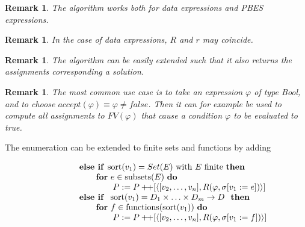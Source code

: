 \documentclass{article}
\newtheorem{remark}[theorem]{Remark}
\newcommand{\concat}{\ensuremath{+\!\!+}}
\begin{document}
\begin{remark}
The algorithm works both for data expressions and PBES expressions.
\end{remark}

\begin{remark}
In the case of data expressions, $R$ and $r$ may coincide.%
\end{remark}

\begin{remark}
The algorithm can be easily extended such that it also returns the assignments
corresponding a solution.
\end{remark}

\begin{remark}
The most common use case is to take an expression $\varphi $ of
type Bool, and to choose $accept(\varphi )\equiv \varphi \neq false$.
Then it can for example be used to compute all assignments to $FV(\varphi)$
that cause a condition $\varphi$ to be evaluated to true.
\end{remark}

The enumeration can be extended to finite sets and functions by adding

\[
\begin{tabular}{l}
\qquad \qquad \textbf{else if }$\mathrm{sort}(v_{1})=Set(E)$
with $E$ finite \textbf{then} \\
\qquad \qquad \qquad \textbf{for} $e\in \mathrm{subsets}(E)$ \textbf{do} \\
\qquad \qquad \qquad \qquad $P:=P\concat\lbrack \left\langle [v_{2},\ldots ,v_{n}],R(\varphi ,\sigma \lbrack v_{1}:=e])\right\rangle ]$ \\
\qquad \qquad \textbf{else if } $\mathrm{sort}%
(v_{1})=D_{1}\times \ldots \times D_{m}\rightarrow D$ \textbf{ then}
\\
\qquad \qquad \qquad \textbf{for} $f\in \mathrm{functions}(\mathrm{%
sort}(v_{1}))$ \textbf{do} \\
\qquad \qquad \qquad \qquad $P:=P\concat\lbrack \left\langle [v_{2},\ldots ,v_{n}],R(\varphi ,\sigma \lbrack v_{1}:=f])\right\rangle ]$%
\end{tabular}%
\]
\end{document}
